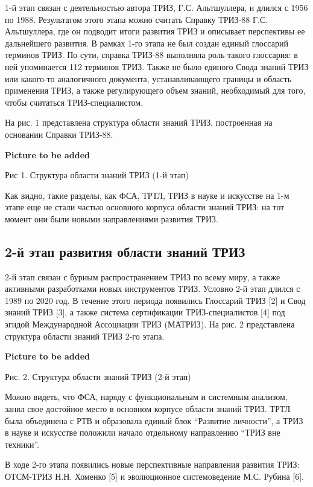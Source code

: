 \documentclass[11pt,a4paper]{article}
\newcommand{\addpicture}{\textbf{Picture to be added}\par}
\begin{document}
1-й этап связан с деятельностью автора ТРИЗ, Г.С. Альтшуллера, и длился с 1956
по 1988. Результатом этого этапа можно считать Справку ТРИЗ-88
Г.С. Альтшуллера, где он подводит итоги развития ТРИЗ и описывает перспективы
ее дальнейшего развития. В рамках 1-го этапа не был создан единый глоссарий
терминов ТРИЗ. По сути, справка ТРИЗ-88 выполняла роль такого глоссария: в ней
упоминается 112 терминов ТРИЗ. Также не было единого Свода знаний ТРИЗ или
какого-то аналогичного документа, устанавливающего границы и область
применения ТРИЗ, а также регулирующего объем знаний, необходимый для того,
чтобы считаться ТРИЗ-специалистом.

На рис. 1 представлена структура области знаний ТРИЗ, построенная на основании
Справки ТРИЗ-88.

\begin{center}
  \addpicture
  Рис 1. Структура области знаний ТРИЗ (1-й этап)
\end{center}
Как видно, такие разделы, как ФСА, ТРТЛ, ТРИЗ в науке и искусстве на 1-м этапе
еще не стали частью основного корпуса области знаний ТРИЗ: на тот момент они
были новыми направлениями развития ТРИЗ.

\subsection{2-й этап развития области знаний ТРИЗ}

2-й этап связан с бурным распространением ТРИЗ по всему миру, а также
активными разработками новых инструментов ТРИЗ. Условно 2-й этап длился с 1989
по 2020 год. В течение этого периода появились Глоссарий ТРИЗ [2] и Свод
знаний ТРИЗ [3], а также система сертификации ТРИЗ-специалистов [4] под эгидой
Международной Ассоциации ТРИЗ (МАТРИЗ). На рис. 2 представлена структура
области знаний ТРИЗ 2-го этапа. 

\begin{center}
  \addpicture
  Рис. 2. Структура области знаний ТРИЗ (2-й этап)
\end{center}
Можно видеть, что ФСА, наряду с функциональным и системным анализом, занял
свое достойное место в основном корпусе области знаний ТРИЗ. ТРТЛ была
объединена с РТВ и образовала единый блок “Развитие личности”, а ТРИЗ в науке
и искусстве положили начало отдельному направлению “ТРИЗ вне техники”.

В ходе 2-го этапа появились новые перспективные направления развития ТРИЗ:
ОТСМ-ТРИЗ Н.Н. Хоменко [5] и эволюционное системоведение М.С. Рубина [6].
\end{document}
